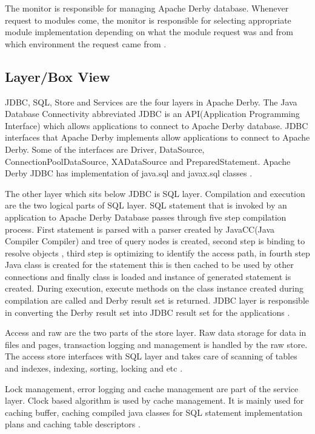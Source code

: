 \documentclass[9pt,twocolumn,twoside]{../../styles/osajnl}
\begin{document}
The monitor is responsible for managing Apache Derby
database. Whenever request to modules come, the monitor is responsible
for selecting appropriate module implementation depending on what the
module request was and from which environment the request came from
\cite{www-derbyarch}.

\subsection{Layer/Box View} 

JDBC, SQL, Store and Services are the four layers in Apache Derby. The
Java Database Connectivity abbreviated JDBC is an API(Application
Programming Interface) which allows applications to connect to Apache
Derby database. JDBC interfaces that Apache Derby implements allow
applications to connect to Apache Derby. Some of the interfaces are
Driver, DataSource, ConnectionPoolDataSource, XADataSource and
PreparedStatement. Apache Derby JDBC has implementation of java.sql
and javax.sql classes \cite{www-derbyarch}.

The other layer which sits below JDBC is SQL layer. Compilation and
execution are the two logical parts of SQL layer. SQL statement that
is invoked by an application to Apache Derby Database passes through
five step compilation process. First statement is parsed with a parser
created by JavaCC(Java Compiler Compiler) and tree of query nodes is
created, second step is binding to resolve objects , third step is
optimizing to identify the access path, in fourth step Java class is
created for the statement this is then cached to be used by other
connections and finally class is loaded and instance of generated
statement is created. During execution, execute methods on the class
instance created during compilation are called and Derby result set is
returned. JDBC layer is responsible in converting the Derby result set
into JDBC result set for the applications \cite{www-derbyarch}.

Access and raw are the two parts of the store layer. Raw data storage
for data in files and pages, transaction logging and management is
handled by the raw store. The access store interfaces with SQL layer
and takes care of scanning of tables and indexes, indexing, sorting,
locking and etc \cite{www-derbyarch}.

Lock management, error logging and cache management are part of the
service layer. Clock based algorithm is used by cache management. It
is mainly used for caching buffer, caching compiled java classes for
SQL statement implementation plans and caching table descriptors
\cite{www-derbyarch}.
\end{document}

